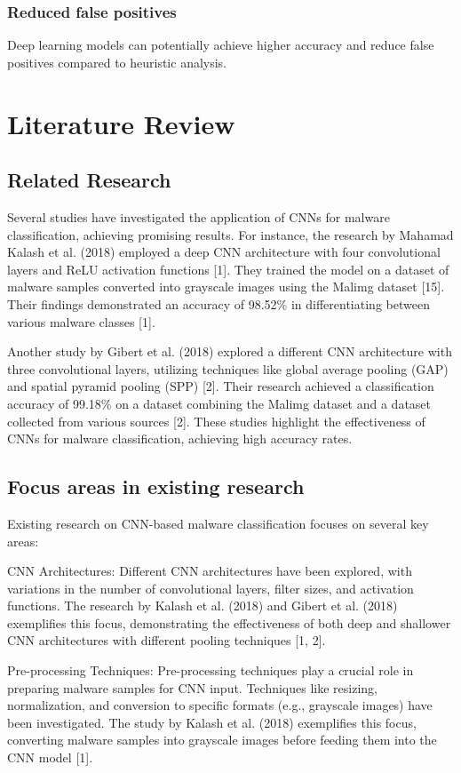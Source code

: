 \documentclass[conference]{IEEEtran}
\begin{document}
\subsubsection{Reduced false positives} Deep learning models can potentially achieve higher accuracy and reduce false positives compared to heuristic analysis.


\section{Literature Review}
\subsection{Related Research}
Several studies have investigated the application of CNNs for malware classification, achieving promising results. For instance, the research by Mahamad Kalash et al. (2018) employed a deep CNN architecture with four convolutional layers and ReLU activation functions [1]. They trained the model on a dataset of malware samples converted into grayscale images using the Malimg dataset [15]. Their findings demonstrated an accuracy of 98.52\% in differentiating between various malware classes [1].

Another study by  Gibert et al. (2018) explored a different CNN architecture with three convolutional layers, utilizing techniques like global average pooling (GAP) and spatial pyramid pooling (SPP) [2]. Their research achieved a classification accuracy of 99.18\% on a dataset combining the Malimg dataset and a dataset collected from various sources [2]. These studies highlight the effectiveness of CNNs for malware classification, achieving high accuracy rates.

\subsection{Focus areas in existing research}
Existing research on CNN-based malware classification focuses on several key areas:

    CNN Architectures: Different CNN architectures have been explored, with variations in the number of convolutional layers, filter sizes, and activation functions. The research by Kalash et al. (2018) and Gibert et al. (2018) exemplifies this focus, demonstrating the effectiveness of both deep and shallower CNN architectures with different pooling techniques [1, 2].

    Pre-processing Techniques:  Pre-processing techniques play a crucial role in preparing malware samples for CNN input. Techniques like resizing, normalization, and conversion to specific formats (e.g., grayscale images) have been investigated. The study by Kalash et al. (2018) exemplifies this focus, converting malware samples into grayscale images before feeding them into the CNN model [1].
\end{document}
